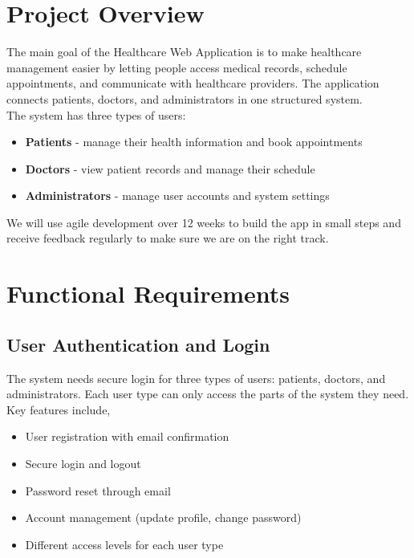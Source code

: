 \documentclass[12pt,a4paper]{article}
\newcommand{\sectionbreak}{\vspace{0.5cm}}
\begin{document}


\newpage

\tableofcontents

\newpage

\section{Project Overview}

 The main goal of the Healthcare Web Application is to make healthcare management easier by letting people access medical records, schedule appointments, and communicate with healthcare providers. The application connects patients, doctors, and administrators in one structured system.\\
\noindent
The system has three types of users:
\begin{itemize}[itemsep=0.2cm]
    \item \textbf{Patients} - manage their health information and book appointments
    \item \textbf{Doctors} - view patient records and manage their schedule
    \item \textbf{Administrators} - manage user accounts and system settings
\end{itemize}

We will use agile development over 12 weeks to build the app in small steps and receive feedback regularly to make sure we are on the right track.

\sectionbreak

\section{Functional Requirements}

\subsection{User Authentication and Login}

The system needs secure login for three types of users: patients, doctors, and administrators. Each user type can only access the parts of the system they need. Key features include,
\begin{itemize}[itemsep=0.1cm]
    \item User registration with email confirmation
    \item Secure login and logout
    \item Password reset through email
    \item Account management (update profile, change password)
    \item Different access levels for each user type
\end{itemize}
\end{document}
